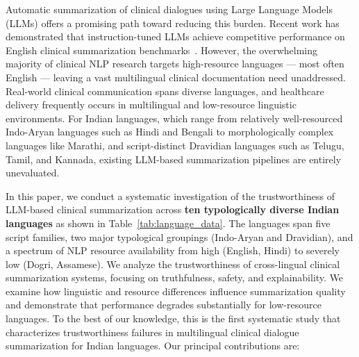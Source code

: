\documentclass[conference]{IEEEtran}
\begin{document}
Automatic summarization of clinical dialogues using Large Language Models
(LLMs) offers a promising path toward reducing this burden. Recent work has
demonstrated that instruction-tuned LLMs achieve competitive performance on
English clinical summarization benchmarks~\cite{tang2023gersteinlab,
abacha2023overview}. However, the overwhelming majority of clinical NLP
research targets high-resource languages --- most often English --- leaving
a vast multilingual clinical documentation need unaddressed. Real-world
clinical communication spans diverse languages, and healthcare delivery
frequently occurs in multilingual and low-resource linguistic environments.
For Indian languages, which range from relatively well-resourced Indo-Aryan
languages such as Hindi and Bengali to morphologically complex languages
like Marathi, and script-distinct Dravidian languages such as Telugu, Tamil,
and Kannada, existing LLM-based summarization pipelines are entirely
unevaluated.

In this paper, we conduct a systematic investigation of the trustworthiness
of LLM-based clinical summarization across \textbf{ten typologically diverse
Indian languages} as shown in Table~\ref{tab:language_data}. The languages
span five script families, two major typological groupings (Indo-Aryan and
Dravidian), and a spectrum of NLP resource availability from high (English,
Hindi) to severely low (Dogri, Assamese). We analyze the trustworthiness of
cross-lingual clinical summarization systems, focusing on truthfulness,
safety, and explainability. We examine how linguistic and resource
differences influence summarization quality and demonstrate that performance
degrades substantially for low-resource languages. To the best of our
knowledge, this is the first systematic study that characterizes
trustworthiness failures in multilingual clinical dialogue summarization for
Indian languages. Our principal contributions are:
\end{document}
